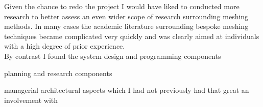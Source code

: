\noindent
Given the chance to redo the project I would have liked to conducted more research to better assess an even wider scope of research surrounding meshing methods. In many cases the academic literature surrounding bespoke meshing techniques became complicated very quickly and was clearly aimed at individuals with a high degree of prior experience. \\ 



By contrast I found the system design and programming components 


planning and research components 

managerial architectural aspects which I had not previously had that great an involvement with










